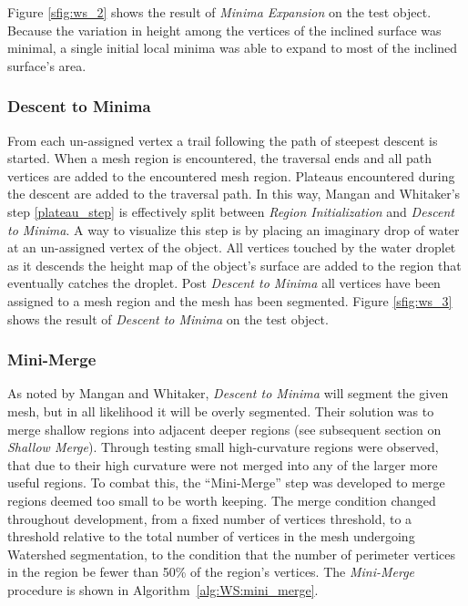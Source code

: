 Figure \ref{sfig:ws_2} shows the result of \textit{Minima Expansion} on the test object.
Because the variation in height among the vertices of the inclined surface was minimal, a single initial local minima was able to expand to most of the inclined surface's area.

\subsubsection{Descent to Minima}
From each un-assigned vertex a trail following the path of steepest descent is started.
When a mesh region is encountered, the traversal ends and all path vertices are added to the encountered mesh region.
Plateaus encountered during the descent are added to the traversal path.
In this way, Mangan and Whitaker's step \ref{plateau_step} is effectively split between \textit{Region Initialization} and \textit{Descent to Minima}.
A way to visualize this step is by placing an imaginary drop of water at an un-assigned vertex of the object.
All vertices touched by the water droplet as it descends the height map of the object's surface are added to the region that eventually catches the droplet.
Post \textit{Descent to Minima} all vertices have been assigned to a mesh region and the mesh has been segmented.
Figure \ref{sfig:ws_3} shows the result of \textit{Descent to Minima} on the test object.


\subsubsection{Mini-Merge}
As noted by Mangan and Whitaker, \textit{Descent to Minima} will segment the given mesh, but in all likelihood it will be overly segmented.
Their solution was to merge shallow regions into adjacent deeper regions (see subsequent section on \textit{Shallow Merge}).
Through testing small high-curvature regions were observed, that due to their high curvature were not merged into any of the larger more useful regions.
To combat this, the ``Mini-Merge'' step was developed to merge regions deemed too small to be worth keeping.
The merge condition changed throughout development, from a fixed number of vertices threshold, to a threshold relative to the total number of vertices in the mesh undergoing Watershed segmentation, to the condition that the number of perimeter vertices in the region be fewer than 50\% of the region's vertices.
The \textit{Mini-Merge} procedure is shown in Algorithm~\ref{alg:WS:mini_merge}.

